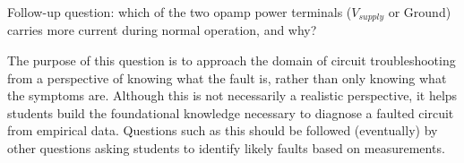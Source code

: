 \vskip 10pt

Follow-up question: which of the two opamp power terminals ($V_{supply}$ or Ground) carries more current during normal operation, and why?







The purpose of this question is to approach the domain of circuit troubleshooting from a perspective of knowing what the fault is, rather than only knowing what the symptoms are.  Although this is not necessarily a realistic perspective, it helps students build the foundational knowledge necessary to diagnose a faulted circuit from empirical data.  Questions such as this should be followed (eventually) by other questions asking students to identify likely faults based on measurements.




